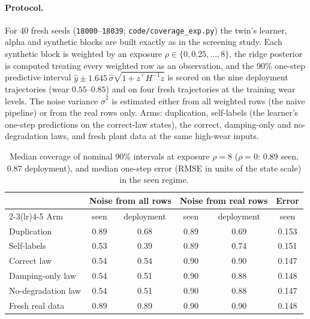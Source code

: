 \paragraph{Protocol.} For 40 fresh seeds (\texttt{18000}--\texttt{18039}; \texttt{code/\allowbreak coverage\_\allowbreak exp.py}) the twin's learner, alpha and synthetic blocks are built exactly as in the screening study. Each synthetic block is weighted by an exposure $\rho\in\{0,0.25,\dots,8\}$, the ridge posterior is computed treating every weighted row as an observation, and the 90\% one-step predictive interval $\hat y\pm1.645\,\hat\sigma\sqrt{1+z^\top H^{-1}z}$ is scored on the nine deployment trajectories (wear $0.55$--$0.85$) and on four fresh trajectories at the training wear levels. The noise variance $\hat\sigma^2$ is estimated either from all weighted rows (the naive pipeline) or from the real rows only. Arms: duplication, self-labels (the learner's one-step predictions on the correct-law states), the correct, damping-only and no-degradation laws, and fresh plant data at the same high-wear inputs.
\begin{table}[H]\centering\small
\caption{Median coverage of nominal 90\% intervals at exposure $\rho=8$ ($\rho=0$: $0.89$ seen, $0.87$ deployment), and median one-step error (RMSE in units of the state scale) in the seen regime.}\label{tab:coverage}
\begin{tabular}{@{}lccccc@{}}
\toprule
 & \multicolumn{2}{c}{Noise from all rows} & \multicolumn{2}{c}{Noise from real rows} & Error\\
\cmidrule(lr){2-3}\cmidrule(lr){4-5}
Arm & seen & deployment & seen & deployment & seen\\
\midrule
Duplication & 0.89 & 0.68 & 0.89 & 0.69 & 0.153\\
Self-labels & 0.53 & 0.39 & 0.89 & 0.74 & 0.151\\
Correct law & 0.54 & 0.54 & 0.90 & 0.90 & 0.147\\
Damping-only law & 0.54 & 0.51 & 0.90 & 0.88 & 0.148\\
No-degradation law & 0.54 & 0.51 & 0.90 & 0.88 & 0.147\\
Fresh real data & 0.89 & 0.89 & 0.90 & 0.90 & 0.148\\
\bottomrule
\end{tabular}
\end{table}

